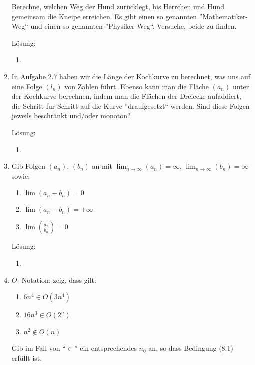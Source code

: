 \documentclass[../main.tex]{subfiles}
\begin{document}
\begin{enumerate}
	      Berechne, welchen Weg der Hund zurücklegt, bis Herrchen und Hund gemeinsam die Kneipe erreichen.
	      Es gibt einen so genannten ”Mathematiker-Weg“ und einen so genannten
	      ”Physiker-Weg“. Versuche, beide zu finden.
          
          Lösung:
          \begin{enumerate}
              \item 
          \end{enumerate}
	\item  In Aufgabe \( 2.7 \) haben wir die Länge der Kochkurve zu berechnet, was uns auf
	      eine Folge \( (l_n) \) von Zahlen führt. Ebenso kann man die Fläche \( (a_n) \) unter der
	      Kochkurve berechnen, indem man die Flächen der Dreiecke aufaddiert, die
	      Schritt fur Schritt auf die Kurve ”draufgesetzt“ werden.
	      Sind diese Folgen jeweils beschränkt und/oder monoton?
          
          Lösung:
          \begin{enumerate}
              \item 
          \end{enumerate}
	\item Gib Folgen \( (a_n) \), \( (b_n) \) an mit \( \lim_{n \to \infty}(a_n) = \infty \),
	      \( \lim_{n \to \infty}(b_n) = \infty \) sowie:
	      \begin{enumerate}
		      \item \( \lim(a_n - b_n) = 0 \)
		      \item \( \lim(a_n - b_n) = + \infty \)
		      \item \( \lim( \frac{a_n}{b_n}) = 0 \)
	      \end{enumerate}
          
          Lösung:
          \begin{enumerate}
              \item 
          \end{enumerate}
	\item \( O \)- Notation: zeig, dass gilt:
	      \begin{enumerate}
		      \item \( 6n^4  \in O(3n^4) \)
		      \item \( 16n^3 \in O(2^n) \)
		      \item \( n^2 \notin O(n) \)
	      \end{enumerate}
	      Gib im Fall von "`\( \in \)"' ein entsprechendes \( n_0 \) an, so dass Bedingung
	      (8.1) erfüllt ist.
          

\end{enumerate}
\end{document}
